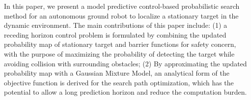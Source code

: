 \documentclass[twocolumn,10pt]{asme2e}
\begin{document}

In this paper, we present a model predictive control-based probabilistic search method for an autonomous ground robot to localize a stationary target in the dynamic environment.
The main contributions of this paper include: 
(1) a receding horizon control problem is formulated by combining  the updated probability map of stationary target and barrier functions for safety concern, with the purpose of maximizing the probability of detecting the target while avoiding collision with surrounding obstacles;
(2) By approximating the updated probability map with a Gaussian Mixture Model, an analytical form of the objective function is derived for the search path optimization, which has the potential to allow a long prediction horizon and reduce the computation burden.
\end{document}
